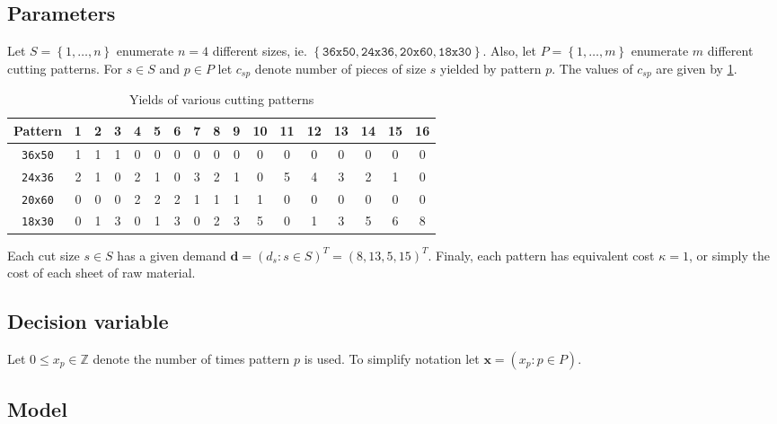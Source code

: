 \documentclass[8pt,oneside]{extarticle}
\newcommand{\Int}{\mathbb{Z}}
\newcommand{\vect}[1]{\boldsymbol{#1}}
\begin{document}
\subsection{Parameters}

Let $S =\left\lbrace 1, \ldots, n\right\rbrace$ enumerate $n=4$ different sizes, ie.
$\left\lbrace \texttt{36x50}, \texttt{24x36}, \texttt{20x60}, \texttt{18x30}\right\rbrace$.
Also, let $P=\left\lbrace 1,\ldots, m\right\rbrace$ enumerate $m$ different cutting patterns.
For $s\in S$ and $p\in P$ let $c_{sp}$ denote number of pieces of size $s$ yielded
by pattern $p$. The values of $c_{sp}$ are given by \cref{table:d5-yield}.

\begin{table}[h]
    \center
    \caption{Yields of various cutting patterns}\label{table:d5-yield}
    \begin{tabular}{ccccccccccccccccc}
        \hline
        \textbf{Pattern} & \textbf{1} & \textbf{2} &\textbf{3} &\textbf{4} &\textbf{5}&\textbf{6}&\textbf{7}&\textbf{8}&\textbf{9}&\textbf{10}&\textbf{11}&\textbf{12}&\textbf{13}&\textbf{14}&\textbf{15}&\textbf{16} \\
        \hline
        \texttt{36x50} & 1 & 1 & 1 & 0 & 0 & 0 &0 & 0 & 0 & 0 & 0 & 0 & 0 & 0 & 0 & 0 \\
        \texttt{24x36} & 2 & 1 & 0 & 2 & 1 & 0 & 3 & 2 & 1 & 0 & 5 & 4 & 3 & 2 & 1 & 0 \\
        \texttt{20x60} & 0 & 0 & 0 & 2 & 2 & 2 & 1 & 1 & 1 & 1 & 0 & 0 & 0 & 0 & 0 & 0 \\
        \texttt{18x30} & 0 & 1 & 3 & 0 & 1 & 3 & 0 & 2 & 3 & 5 & 0 & 1 & 3 & 5 & 6 & 8 \\
        \hline
    \end{tabular}
\end{table}

Each cut size $s\in S$ has a given demand $\vect{d} =\left( d_s : s \in S\right)^T
= \left( 8, 13, 5, 15\right)^T$. Finaly, each pattern has equivalent cost $\kappa = 1$,
or simply the cost of each sheet of raw material.

\subsection{Decision variable}

Let $0 \leq x_{p} \in \Int$ denote the number of times pattern $p$ is used. To simplify
notation let $\vect{x} = \left( x_p : p \in P\right)$.

\subsection{Model}
\end{document}

